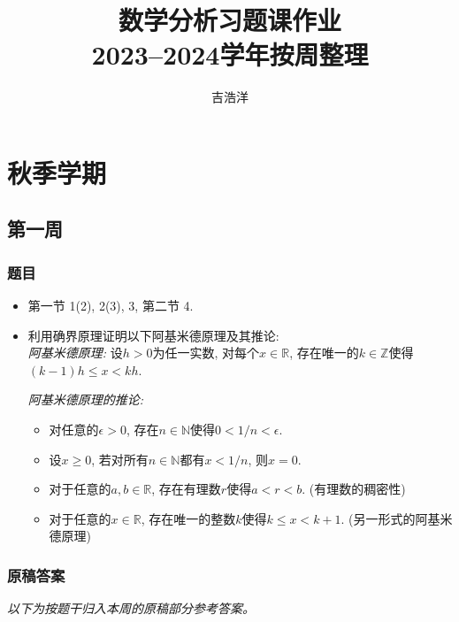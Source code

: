 \documentclass[UTF8,11pt, a4paper, oneside, fontset=none]{ctexbook}
\title{数学分析习题课作业\\2023--2024学年按周整理}
\author{吉浩洋}
\date{}
\begin{document}
\maketitle

\tableofcontents

\clearpage

\chapter{秋季学期}

\clearpage

\section{第一周}

\subsection*{题目}

\begin{itemize}
\item[1.] 第一节 1(2), 2(3), 3, 第二节 4.
\item[2] 利用确界原理证明以下阿基米德原理及其推论:\\
\noindent
{\it 阿基米德原理:} 设$h>0$为任一实数, 对每个$x \in \mathbb R$, 存在唯一的$k \in \mathbb Z$使得$(k-1)h \leq x < kh$. 

\noindent
{\it 阿基米德原理的推论:}
\begin{itemize}
\item[(1)] 对任意的$\epsilon >0$, 存在$n \in \mathbb N$使得$0 < 1/n < \epsilon$.
\item[(2)] 设$x \geq 0$, 若对所有$n \in \mathbb N$都有$x < 1/n$, 则$x =0$.
\item[(3)] 对于任意的$a, b \in \mathbb R$, 存在有理数$r$使得$a < r < b$. (有理数的稠密性)
\item[(4)] 对于任意的$x \in \mathbb R$, 存在唯一的整数$k$使得$k \leq x <k+1$. (另一形式的阿基米德原理)
\end{itemize}

\end{itemize}

\clearpage

\subsection*{原稿答案}

\noindent\emph{以下为按题干归入本周的原稿部分参考答案。}
\end{document}
